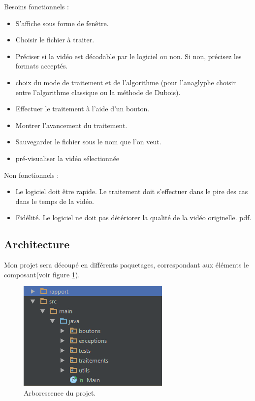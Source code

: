 \documentclass[10pt,a4paper]{article}
\begin{document}
Besoins fonctionnels :\newline
\begin{itemize}
\item S'affiche sous forme de fenêtre.
\item Choisir le fichier à traiter.
\item Préciser si la vidéo est décodable par le logiciel ou non. Si non, précisez les formats acceptés.
\item choix du mode de traitement et de l'algorithme (pour l'anaglyphe choisir entre l'algorithme classique ou la méthode
de Dubois).
\item Effectuer le traitement à l'aide d'un bouton.
\item Montrer l'avancement du traitement.
\item Sauvegarder le fichier sous le nom que l'on veut.
\item pré-visualiser la vidéo sélectionnée\newline
\end{itemize}

Non fonctionnels :\newline
\begin{itemize}
\item Le logiciel doit être rapide. Le traitement doit s'effectuer dans le pire des cas dans le temps de la vidéo.
\item Fidélité. Le logiciel ne doit pas détériorer la qualité de la vidéo originelle.
pdf.\newline
\end{itemize}

\subsection{Architecture}

Mon projet sera découpé en différents paquetages, correspondant aux éléments le composant(voir figure \ref{arbo}).

\begin{figure}[!h]
\center
\includegraphics[scale = 1]{tree.PNG}
\caption{Arborescence du projet.}
\label{arbo}
\end{figure}
\end{document}
